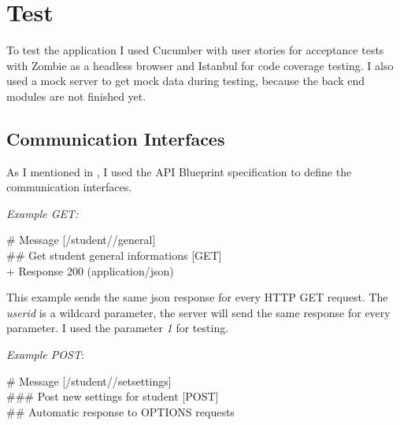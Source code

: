 \chapter{Test}
\label{7-test}

To test the application I used Cucumber with user stories for acceptance tests with Zombie as a headless browser and Istanbul for code coverage testing. I also used a mock server to get mock data during testing, because the back end modules are not finished yet.

\section{Communication Interfaces}
As I mentioned in , I used the API Blueprint specification to define the communication interfaces. 

\emph{Example GET:}

\# Message {[}/student//general{]}\\
\#\# Get student general informations [GET]\\
$+$ Response 200 (application/json)
\begin{addmargin}[1em]{1em}
\end{addmargin}

This example sends the same json response for every HTTP GET request. The \emph{userid} is a wildcard parameter, the server will send the same response for every parameter. I used the parameter \emph{1} for testing.
	
	
\emph{Example POST}:

\# Message {[}/student//setsettings{]}\\
\#\#\# Post new settings for student {[}POST{]}\\
\#\# Automatic response to OPTIONS requests


